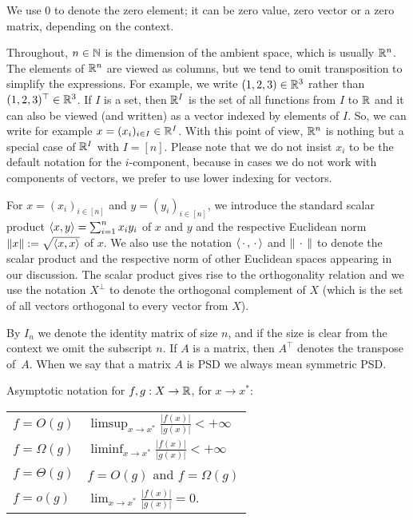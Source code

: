 We use $0$ to denote the zero element; it can be zero value, zero vector or a zero matrix, depending on the context. 

Throughout, $n \in \mathbb{N}$ is the dimension of the ambient space, which is usually $\mathbb{R}^n$. The elements of $\mathbb{R}^n$ are viewed as columns, but we tend to omit transposition to simplify the expressions. For example, we write $(1,2,3) \in \mathbb{R}^3$ rather than $(1,2,3)^\top \in \mathbb{R}^3$. If $I$ is a set, then $\mathbb{R}^I$ is the set of all functions from $I$ to $\mathbb{R}$ and it can also be viewed (and written) as a vector indexed by elements of $I$. So, we can write for example $x=(x_i)_{i \in I} \in \mathbb{R}^I$. With this point of view, $\mathbb{R}^n$ is nothing but a special case of $\mathbb{R}^I$ with $I=[n]$. Please note that we do not insist $x_i$ to be the default notation for the $i$-component, because in cases we do not work with components of vectors, we prefer to use lower indexing for vectors. 

For $x= (x_i)_{i \in [n]}$ and $y = (y_i)_{i \in [n]}$, we introduce the standard scalar product $\left\langle x , y \right\rangle = \sum_{i=1}^n x_i y_i$ of $x$ and $y$ and the respective Euclidean norm $\|x\| := \sqrt{\left\langle x , x \right\rangle}$ of $x$. We also use the notation $\left\langle \, \cdot \, , \, \cdot \, \right\rangle$ and $\|\, \cdot \,\|$ to denote the scalar product and the respective norm of other Euclidean spaces appearing in our discussion. The scalar product gives rise to the orthogonality relation and we use the notation $X^\perp$ to denote the orthogonal complement of $X$ (which is the set of all vectors orthogonal to every vector from $X$). 

By $I_n$ we denote the identity matrix of size $n$, and if the size is clear from the context we omit the subscript $n$. If $A$ is a matrix, then $A^\top$ denotes the transpose of~$A$. When we say that a matrix $A$ is PSD we always mean symmetric PSD.



Asymptotic notation for $f, g: X \to \mathbb{R}$, for $x \to x^\ast$:

\begin{center}
\begin{tabular}{l@{\hskip 5em}l}
	$f=O(g)$ & $\limsup_{x \to x^\ast} \frac{|f(x)|}{|g(x)|} < +\infty$ 
	\\ $f=\Omega(g)$ & $\liminf_{x \to x^\ast} \frac{|f(x)|}{|g(x)|} < +\infty$ 
	\\ $f = \Theta(g)$ & $f= O(g)$ and $f = \Omega(g)$
	\\ $f = o(g)$ & $\lim_{x \to x^\ast} \frac{|f(x)|}{|g(x)|} = 0$. 
\end{tabular}
\end{center}


